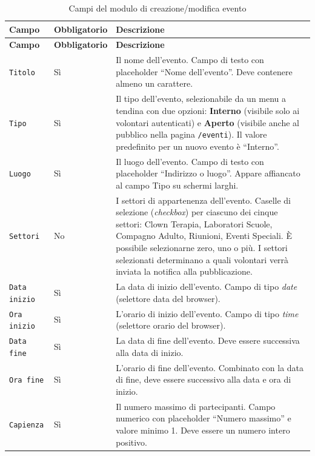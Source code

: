 \documentclass[a4paper,11pt,oneside]{book}
\newcommand{\campo}[1]{\texttt{#1}}
\newcommand{\percorso}[1]{\textcolor{namoCyan}{\texttt{#1}}}
\begin{document}
\begin{longtable}{l l p{7.5cm}}
\caption{Campi del modulo di creazione/modifica evento} \label{tab:campi-evento} \\
\toprule
\textbf{Campo} & \textbf{Obbligatorio} & \textbf{Descrizione} \\
\midrule
\endfirsthead
\toprule
\textbf{Campo} & \textbf{Obbligatorio} & \textbf{Descrizione} \\
\midrule
\endhead
\campo{Titolo} & S\`i & Il nome dell'evento. Campo di testo con placeholder ``Nome dell'evento''. Deve contenere almeno un carattere. \\[6pt]

\campo{Tipo} & S\`i & Il tipo dell'evento, selezionabile da un menu a tendina con due opzioni: \textbf{Interno} (visibile solo ai volontari autenticati) e \textbf{Aperto} (visibile anche al pubblico nella pagina \percorso{/eventi}). Il valore predefinito per un nuovo evento \`e ``Interno''. \\[6pt]

\campo{Luogo} & S\`i & Il luogo dell'evento. Campo di testo con placeholder ``Indirizzo o luogo''. Appare affiancato al campo Tipo su schermi larghi. \\[6pt]

\campo{Settori} & No & I settori di appartenenza dell'evento. Caselle di selezione (\textit{checkbox}) per ciascuno dei cinque settori: Clown Terapia, Laboratori Scuole, Compagno Adulto, Riunioni, Eventi Speciali. \`E possibile selezionarne zero, uno o pi\`u. I settori selezionati determinano a quali volontari verr\`a inviata la notifica alla pubblicazione. \\[6pt]

\campo{Data inizio} & S\`i & La data di inizio dell'evento. Campo di tipo \textit{date} (selettore data del browser). \\[6pt]

\campo{Ora inizio} & S\`i & L'orario di inizio dell'evento. Campo di tipo \textit{time} (selettore orario del browser). \\[6pt]

\campo{Data fine} & S\`i & La data di fine dell'evento. Deve essere successiva alla data di inizio. \\[6pt]

\campo{Ora fine} & S\`i & L'orario di fine dell'evento. Combinato con la data di fine, deve essere successivo alla data e ora di inizio. \\[6pt]

\campo{Capienza} & S\`i & Il numero massimo di partecipanti. Campo numerico con placeholder ``Numero massimo'' e valore minimo 1. Deve essere un numero intero positivo. \\[6pt]


\end{longtable}
\end{document}
